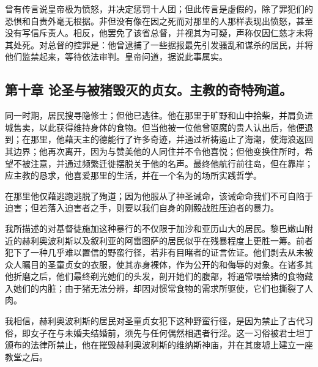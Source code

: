 曾有传言说皇帝极为愤怒，并决定惩罚十人团；但此传言是虚假的，除了罪犯们的恐惧和自责外毫无根据。非但没有像在因之死而对那里的人那样表现出愤怒，甚至没有写信斥责人。相反，他罢免了该省总督，并视其为可疑，声称仅因仁慈才未将其处死。对总督的控罪是：他曾逮捕了一些据报最先引发骚乱和谋杀的居民，并将他们监禁起来，等待依法审判。皇帝问道，据说此事属实。\par


\subsection{第十章 论圣与被猪毁灭的贞女。主教的奇特殉道。}

同一时期，居民搜寻隐修士；但他已逃往。他在那里于旷野和山中拾柴，并肩负进城售卖，以此获得维持身体的食物。但当他被一位他曾驱魔的贵人认出后，他便退到；在那里，他藉天主的德能行了许多奇迹，并通过祈祷遏止了海潮，使海浪返回其边界；他再次离开，因为与赞美他的人同住并不令他喜悦；但他变换住所时，希望不被注意，并通过频繁迁徙摆脱关于他的名声。最终他航行前往岛，但在靠岸；应主教的恳求，他喜爱那里的生活，并在一个名为的场所实践哲学。\par

在那里他仅藉逃跑逃脱了殉道；因为他服从了神圣诫命，该诫命命我们不可自陷于迫害；但若落入迫害者之手，则要以我们自身的刚毅战胜压迫者的暴力。\par

我所描述的对基督徒施加这种暴行的不仅限于加沙和亚历山大的居民。黎巴嫩山附近的赫利奥波利斯以及叙利亚的阿雷图萨的居民似乎在残暴程度上更胜一筹。前者犯下了一种几乎难以置信的野蛮行径，若非有目睹者的证言佐证。他们剥去从未被众人瞩目的圣童贞女的衣服，使其赤身裸体，作为公开的和侮辱的对象。在诸多其他折磨之后，他们最终剃光她们的头发，剖开她们的腹部，将通常喂给猪的食物藏入她们的内脏；由于猪无法分辨，却因对惯常食物的需求所驱使，它们也撕裂了人肉。\par

我相信，赫利奥波利斯的居民对圣童贞女犯下这种野蛮行径，是因为禁止了古代习俗，即女子在与未婚夫结婚前，须先与任何偶然相遇者行淫。这一习俗被君士坦丁颁布的法律所禁止，他在摧毁赫利奥波利斯的维纳斯神庙，并在其废墟上建立一座教堂之后。\par

